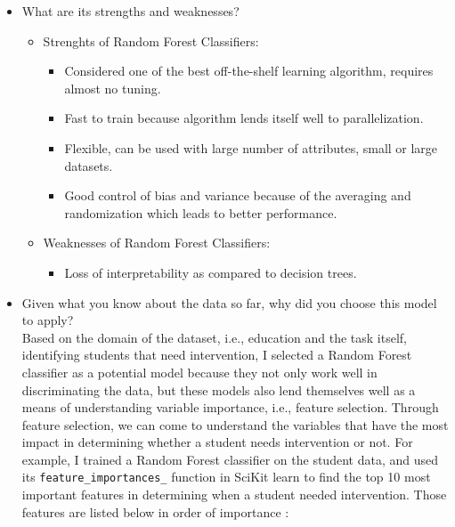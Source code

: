 \documentclass[twoside,openright,titlepage,numbers=noenddot,headinclude,%
               footinclude=true,cleardoublepage=empty,abstractoff,BCOR=5mm,%
               paper=a4,fontsize=11pt,ngerman,american]{scrreprt}
\numberwithin{theorem}{chapter}
\numberwithin{definition}{chapter}
\numberwithin{algorithm}{chapter}
\numberwithin{figure}{chapter}
\numberwithin{table}{chapter}
\numberwithin{equation}{chapter}
\begin{document}
\begin{itemize}
\item What are its strengths and weaknesses?\\
\begin{itemize} 
       \item Strenghts of Random Forest Classifiers:
              \begin{itemize} 
                     \item Considered one of the best off-the-shelf learning algorithm, requires almost no tuning. 
                     \item Fast to train because algorithm lends itself well to parallelization.
                     \item Flexible, can be used with large number of attributes, small or large datasets.
                     \item Good control of bias and variance because of the averaging and randomization which leads to better performance.
              \end{itemize}
       \item Weaknesses of Random Forest Classifiers:
              \begin{itemize} 
                     \item Loss of interpretability as compared to decision trees.
              \end{itemize}
       \end{itemize}


\item Given what you know about the data so far, why did you choose this model to apply?\\
Based on the domain of the dataset, i.e., education and the task itself, identifying students that need intervention, I selected a Random Forest classifier as a potential model because they not only work well in discriminating the data, but these models also lend themselves well as a means of understanding variable importance, i.e., feature selection. Through feature selection, we can come to understand the variables that have the most impact in determining whether a student needs intervention or not.
For example, I trained a Random Forest classifier on the student data, and used its \texttt{feature\_importances\_} function in SciKit learn to find the top 10 most important features in determining when a student needed intervention. Those features are listed below in order of importance : 


\end{itemize}
\end{document}
